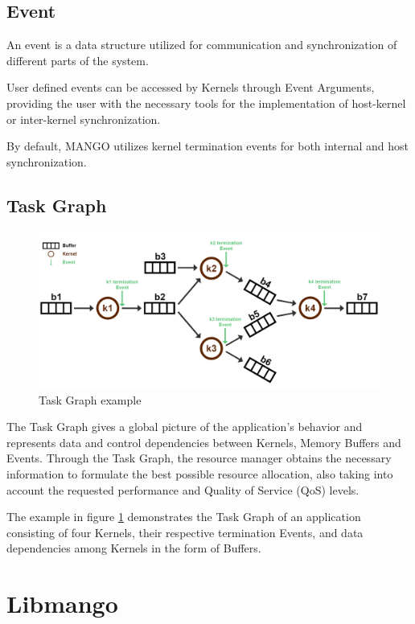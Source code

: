 \subsection{Event}

An event is a data structure utilized for communication and synchronization of different parts of the system.

User defined events can be accessed by Kernels through Event Arguments, providing the user with the necessary tools for the implementation of host-kernel or inter-kernel synchronization.

By default, MANGO utilizes kernel termination events for both internal and host synchronization.

\subsection{Task Graph} \label{arch:TaskGraph}

\begin{figure}[ht]
    \centering
    \includegraphics[width=\textwidth]{img/taskgraph.png}
    \captionsetup{justification=centering}
    \caption{Task Graph example}
    \label{fig:TaskGraph}
\end{figure}

The Task Graph gives a global picture of the application's behavior and represents data and control dependencies between Kernels, Memory Buffers and Events. 
Through the Task Graph, the resource manager obtains the necessary information to formulate the best possible resource allocation, also taking into account the requested performance and Quality of Service (QoS) levels.

The example in figure \ref{fig:TaskGraph} demonstrates the Task Graph of an application consisting of four Kernels, their respective termination Events, and data dependencies among Kernels in the form of Buffers.

\section{Libmango}

